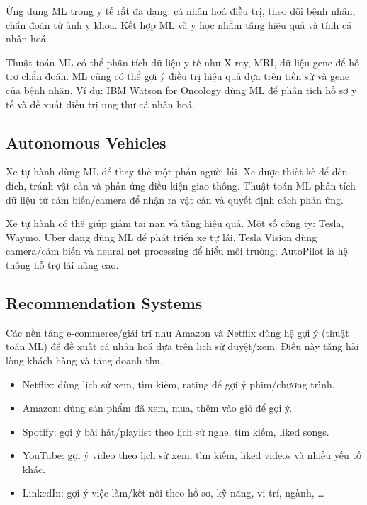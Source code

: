 \begin{dongco}[title={ML hỗ trợ y tế cá nhân hoá}]
Ứng dụng ML trong y tế rất đa dạng: cá nhân hoá điều trị, theo dõi bệnh nhân, chẩn đoán từ ảnh y khoa.
Kết hợp ML và y học nhằm tăng hiệu quả và tính cá nhân hoá.
\end{dongco}

\begin{ynghia}[title={Ví dụ}]
Thuật toán ML có thể phân tích dữ liệu y tế như X-ray, MRI, dữ liệu gene để hỗ trợ chẩn đoán.
ML cũng có thể gợi ý điều trị hiệu quả dựa trên tiền sử và gene của bệnh nhân.
Ví dụ: IBM Watson for Oncology dùng ML để phân tích hồ sơ y tế và đề xuất điều trị ung thư cá nhân hoá.
\end{ynghia}

\subsection{Autonomous Vehicles}

\begin{dongco}[title={Xe tự hành}]
Xe tự hành dùng ML để thay thế một phần người lái.
Xe được thiết kế để đến đích, tránh vật cản và phản ứng điều kiện giao thông.
Thuật toán ML phân tích dữ liệu từ cảm biến/camera để nhận ra vật cản và quyết định cách phản ứng.
\end{dongco}

\begin{ynghia}[title={Ví dụ}]
Xe tự hành có thể giúp giảm tai nạn và tăng hiệu quả.
Một số công ty: Tesla, Waymo, Uber đang dùng ML để phát triển xe tự lái.
Tesla Vision dùng camera/cảm biến và neural net processing để hiểu môi trường; AutoPilot là hệ thống hỗ trợ lái nâng cao.
\end{ynghia}

\subsection{Recommendation Systems}

\begin{dongco}[title={Cá nhân hoá ở quy mô lớn}]
Các nền tảng e-commerce/giải trí như Amazon và Netflix dùng hệ gợi ý (thuật toán ML) để đề xuất cá nhân hoá dựa trên lịch sử duyệt/xem.
Điều này tăng hài lòng khách hàng và tăng doanh thu.
\end{dongco}

\begin{ynghia}[title={Các ví dụ hệ gợi ý}]
\begin{itemize}
  \item Netflix: dùng lịch sử xem, tìm kiếm, rating để gợi ý phim/chương trình.
  \item Amazon: dùng sản phẩm đã xem, mua, thêm vào giỏ để gợi ý.
  \item Spotify: gợi ý bài hát/playlist theo lịch sử nghe, tìm kiếm, liked songs.
  \item YouTube: gợi ý video theo lịch sử xem, tìm kiếm, liked videos và nhiều yếu tố khác.
  \item LinkedIn: gợi ý việc làm/kết nối theo hồ sơ, kỹ năng, vị trí, ngành, \ldots
\end{itemize}
\end{ynghia}

